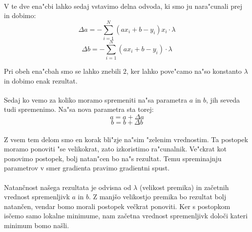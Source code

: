 \paragraph{}
V te dve ena"cbi lahko sedaj vstavimo delna odvoda, ki smo ju nara"cunali prej in dobimo:
\[\Delta a = -\sum_{i=1}^{N} (a x_i + b - y_i)x_i \cdot \lambda \]
\[\Delta b = -\sum_{i=1}^{N} (a x_i + b - y_i) \cdot \lambda \]

Pri obeh ena"cbah smo se lahko znebili $2$, ker lahko pove"camo na"so konstanto $\lambda$ in dobimo enak rezultat.

\paragraph{}
Sedaj ko vemo za koliko moramo spremeniti na"sa parametra $a$ in $b$, jih seveda tudi spremenimo. Na"sa nova parametra sta torej:
\[a = a + \Delta a \]
\[b = b + \Delta b \]

\paragraph{}
Z vsem tem delom smo en korak bli"zje na"sim "zelenim vrednostim. Ta postopek moramo ponoviti "se velikokrat, zato izkoristimo ra"cunalnik. Ve"ckrat kot ponovimo postopek, bolj natan"cen bo na"s rezultat. Temu spreminajnju parametrov v smer gradienta pravimo gradientni spust.

\paragraph{}
Natančnost našega rezultata je odvisna od $\lambda$ (velikost premika) in začetnih vrednost spremenljivk $a$ in $b$. Z manjšo velikostjo premika bo rezultat bolj natančen, vendar bomo morali postopek večkrat ponoviti. Ker s postopkom isčemo samo lokalne minimume, nam začetna vrednost spremenljivk določi kateri minimum bomo našli.
